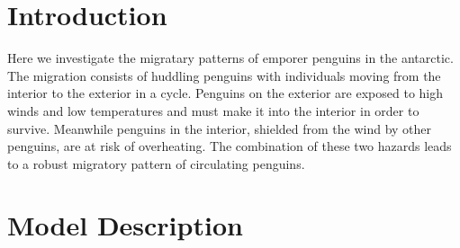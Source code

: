 \documentclass[]{scrartcl}
\begin{document}
 
\section{Introduction}
Here we investigate the migratary patterns of emporer penguins in the antarctic. The migration consists of huddling penguins with individuals moving from the interior to the exterior in a cycle. Penguins on the exterior are exposed to high winds and low temperatures and must make it into the interior in order to survive. Meanwhile penguins in the interior, shielded from the wind by other penguins, are at risk of overheating. The combination of these two hazards leads to a robust migratory pattern of circulating penguins. 

\section{Model Description}
\end{document}
